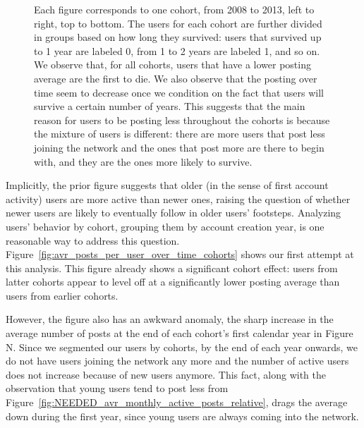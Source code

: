\begin{figure}[!tb]
\caption{Each figure corresponds to one cohort, from 2008 to 2013, left to right, top to bottom. The users for each cohort are further divided in groups based on how long they survived: users that survived up to 1 year are labeled 0, from 1 to 2 years are labeled 1, and so on. We observe that, for all cohorts, users that have a lower posting average are the first to die. We also observe that the posting  over time seem to decrease once we condition on the fact that users will survive a certain number of years. This suggests that the main reason for users to be posting less throughout the cohorts is because the mixture of users is different: there are more users that post less joining the network and the ones that post more are there to begin with, and they are the ones more likely to survive.}
\label{fig:avr_posts_per_user_for_surviving_year}
\end{figure}

Implicitly, the prior figure suggests that older (in the sense of first account activity) users are more active than newer ones, raising the question of whether newer users
are likely to eventually follow in older users' footsteps.  Analyzing users' behavior by cohort, grouping them by account creation year, is one reasonable way to address this question.  Figure~\ref{fig:avr_posts_per_user_over_time_cohorts} shows our first attempt at this analysis.  This figure already shows a significant cohort effect: users from latter cohorts appear to level off at a significantly lower posting average than users from earlier cohorts.  

However, the figure also has an awkward anomaly, the sharp increase in the average number of posts at the end of each cohort's first calendar year in Figure N.  Since we segmented our users by cohorts, by the end of each year onwards, we do not have users joining the network any more and the number of active users does not increase because of new users anymore. This fact, along with the observation that young users tend to post less from Figure~\ref{fig:NEEDED_avr_monthly_active_posts_relative}, drags the average down during the first year, since young users are always coming into the network.  



